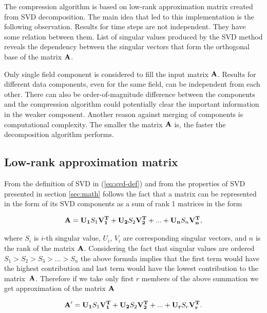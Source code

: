 The compression algorithm is based on low-rank approximation matrix created from SVD decomposition. The main idea that led to this implementation is the following observation. Results for time steps are not independent. They have some relation between them. List of singular values produced by the SVD method reveals the dependency between the singular vectors that form the orthogonal base of the matrix $\mathbf{A}$. 

Only single field component is considered to fill the input matrix $\mathbf{A}$. Results for different data components, even for the same field, can be independent from each other. There can also be order-of-magnitude difference between the components and the compression algorithm could potentially clear the important information in the weaker component. Another reason against merging of components is computational complexity. The smaller the matrix $\mathbf{A}$ is, the faster the decomposition algorithm performs.

\subsection{Low-rank approximation matrix}

From the definition of SVD in (\ref{eq:svd-def}) and from the properties of SVD presented in section \ref{sec:math} follows the fact that a matrix can be represented in the form of its SVD components as a sum of rank 1 matrices in the form

\begin{equation}
\mathbf{A}=\mathbf{U_{1}}S_{1}\mathbf{V_{1}^{T}}+\mathbf{U_{2}}S_{2}\mathbf{V_{2}^{T}}+ ... +\mathbf{U_{n}}S_{n}\mathbf{V_{n}^{T}},
\label{eq:svd-expansion}
\end{equation}

where $S_{i}$ is $i$-th singular value, $U_{i}$, $V_{i}$ are corresponding singular vectors, and $n$ is the rank of the matrix $\mathbf{A}$. Considering the fact that singular values are ordered $S_{1}>S_{2}>S_{3}> ... >S_{n}$ the above formula implies that the first term would have the highest contribution and last term would have the lowest contribution to the matrix~$\mathbf{A}$. Therefore if we take only first $r$ members of the above summation we get approximation of the matrix $\mathbf{A}$

\begin{equation}
\mathbf{A'}=\mathbf{U_{1}}S_{1}\mathbf{V_{1}^{T}}+\mathbf{U_{2}}S_{2}\mathbf{V_{2}^{T}}+ ... +\mathbf{U_{r}}S_{r}\mathbf{V_{r}^{T}}.
\label{eq:svd-approx-expansion}
\end{equation}

